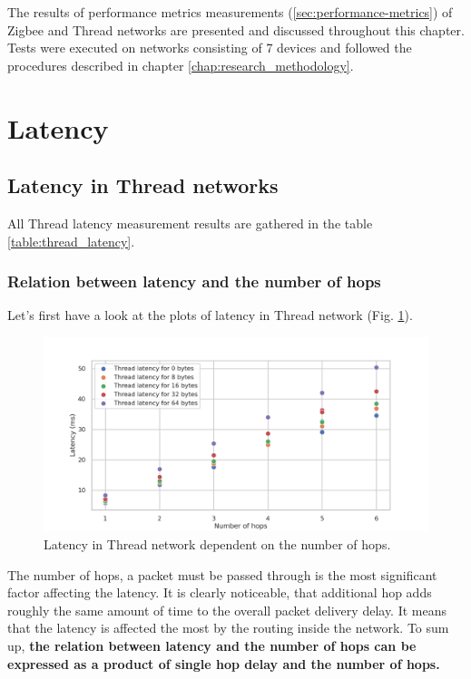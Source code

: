 
The results of performance metrics  
measurements (\ref{sec:performance-metrics}) of Zigbee and Thread
networks are presented and discussed throughout this chapter. Tests
were executed on networks consisting of 7 devices
and followed the procedures described in chapter \ref{chap:research_methodology}.

\section{Latency}
\label{sec:latency}

\subsection{Latency in Thread networks}

All Thread latency measurement results are gathered in the table \ref{table:thread_latency}.

\subsubsection*{Relation between latency and the number of hops}

Let's first have a look at the plots of latency in Thread network 
(Fig. \ref{fig:thread_latency_all}).

\begin{figure}[H]
    \centering
    \includegraphics[scale=0.45]{images/Thread_Latency_all.png}
    \caption{Latency in Thread network dependent on the number of hops.}
    \label{fig:thread_latency_all}
\end{figure}

The number of hops, a packet must be passed through is the most
significant factor affecting the latency. It is clearly noticeable,
that additional hop adds roughly the same amount of time
to the overall packet delivery delay. It means that the latency is affected the most  
by the routing inside the network. To sum up, \textbf{the relation
between latency and the number of hops can be expressed as a
product of single hop delay and the number of hops.}

